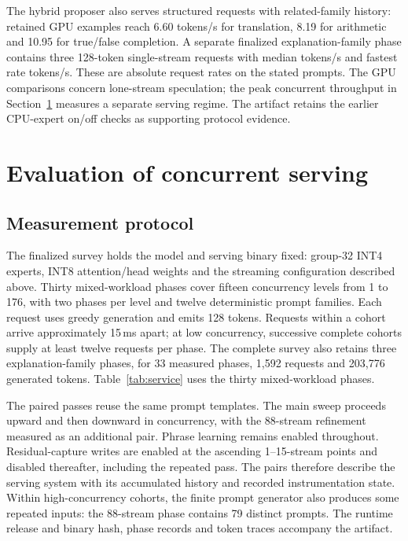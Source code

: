 \documentclass[11pt]{article}
\begin{document}
The hybrid proposer also serves structured requests with related-family history: retained GPU examples reach 6.60 tokens/s for translation, 8.19 for arithmetic and 10.95 for true/false completion. A separate finalized explanation-family phase contains three 128-token single-stream requests with median \SpecGPUExplainMedian{} tokens/s and fastest rate \SpecGPUExplainMax{} tokens/s. These are absolute request rates on the stated prompts. The GPU comparisons concern lone-stream speculation; the peak concurrent throughput in Section~\ref{sec:performance} measures a separate serving regime. The artifact retains the earlier CPU-expert on/off checks as supporting protocol evidence.

\section{Evaluation of concurrent serving}
\label{sec:performance}

\subsection{Measurement protocol}
The finalized survey holds the model and serving binary fixed: group-32 INT4 experts, INT8 attention/head weights and the streaming configuration described above. Thirty mixed-workload phases cover fifteen concurrency levels from 1 to 176, with two phases per level and twelve deterministic prompt families. Each request uses greedy generation and emits 128 tokens. Requests within a cohort arrive approximately 15\,ms apart; at low concurrency, successive complete cohorts supply at least twelve requests per phase. The complete survey also retains three explanation-family phases, for 33 measured phases, 1,592 requests and 203,776 generated tokens. Table~\ref{tab:service} uses the thirty mixed-workload phases.

The paired passes reuse the same prompt templates. The main sweep proceeds upward and then downward in concurrency, with the 88-stream refinement measured as an additional pair. Phrase learning remains enabled throughout. Residual-capture writes are enabled at the ascending 1--15-stream points and disabled thereafter, including the repeated pass. The pairs therefore describe the serving system with its accumulated history and recorded instrumentation state. Within high-concurrency cohorts, the finite prompt generator also produces some repeated inputs: the 88-stream phase contains 79 distinct prompts. The runtime release and binary hash, phase records and token traces accompany the artifact.
\end{document}
